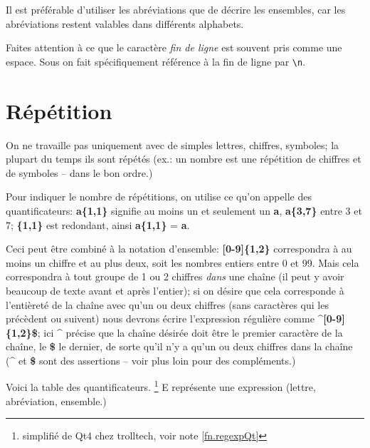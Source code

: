 Il est préférable d'utiliser les abréviations que de décrire les ensembles, car les abréviations restent valables dans différents alphabets.

Faites attention à ce que le caractère \emph{fin de ligne} est souvent pris comme une espace. Sous \Tw{} on fait spécifiquement référence à la fin de ligne par \og\verb|\n|\fg.

\section{Répétition}

On ne travaille pas uniquement avec de simples lettres, chiffres, symboles; la plupart du temps ils sont répétés (ex.: un nombre est une répétition de chiffres et de symboles -- dans le bon ordre.)

Pour indiquer le nombre de répétitions, on utilise ce qu'on appelle des \og quantificateurs\fg: \textbf{a\{1,1\}} signifie au moins un et seulement un \textbf{a}, \textbf{a\{3,7\}} entre 3 et 7; \textbf{\{1,1\}} est redondant, ainsi \textbf{a\{1,1\}} = \textbf{a}.

Ceci peut être combiné à la notation d'ensemble: \textbf{[0-9]\{1,2\}} correspondra à au moins un chiffre et au plus deux, soit les nombres entiers entre 0 et 99. Mais cela correspondra à tout groupe de 1 ou 2 chiffres \emph{dans} une chaîne (il peut y avoir beaucoup de texte avant et après l'entier); si on désire que cela corresponde à l'entièreté de la chaîne avec qu'un ou deux chiffres (sans caractères qui les précèdent ou suivent) nous devrons écrire l'expression régulière comme \textbf{\^{}[0-9]\{1,2\}\$}; ici \textbf{\^{}} précise que la chaîne désirée doit être le premier caractère de la chaîne, le \textbf{\$} le dernier, de sorte qu'il n'y a qu'un ou deux chiffres dans la chaîne (\textbf{\^{}} et \textbf{\$} sont des \og assertions\fg{} -- voir plus loin pour des compléments.)

Voici la table des quantificateurs. \footnote{simplifié de Qt4 chez trolltech, voir note \ref{fn.regexpQt}} E représente une expression (lettre, abréviation, ensemble.)
\smallskip

